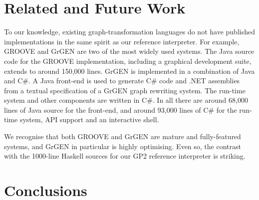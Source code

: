 \section{Related and Future Work}
\label{sec:relatedandfuture}

To our knowledge, existing graph-transformation languages do not have published implementations
in the same spirit as our reference interpreter.
For example, GROOVE\cite{Ghamarianetal12} and GrGEN\cite{JakumeitBuchwaldKroll2010}
are two of the most widely used systems.
The Java source code for the GROOVE implementation, including a graphical development suite,
extends to around 150,000 lines.
GrGEN is implemented in a combination of Java and C\#.
A Java front-end is used to generate C\# code and
.NET assemblies from a textual specification of a GrGEN graph rewriting system.
The run-time system and other components are written in C\#. 
In all there are around 68,000 lines of Java source for the front-end,
and around 93,000 lines of C\# for the run-time system, API support and an interactive shell.

We recognise that both GROOVE and GrGEN are mature and fully-featured systems,
and GrGEN in particular is highly optimising.
Even so, the contrast with the 1000-line Haskell sources for our GP2 reference interpreter
is striking.

\section{Conclusions}
\label{sec:conclusions}






